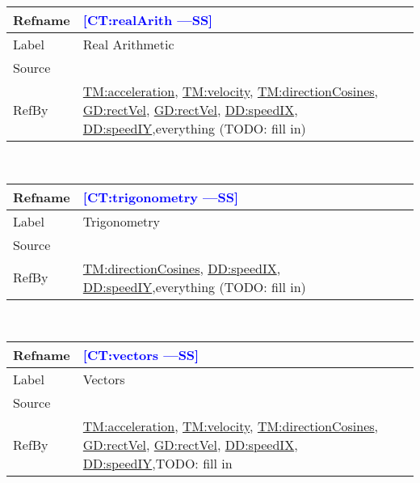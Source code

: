 \documentclass[12pt]{article}
\newcommand{\authornote}[3]{\textcolor{#1}{[#3 ---#2]}}
\newcommand{\authornote}[3]{}
\newcommand{\wss}[1]{\authornote{blue}{SS}{#1}}
\begin{document}
\medskip
\noindent
\begin{minipage}{\textwidth}
\begin{tabular}{>{\raggedright}p{}>{\raggedright\arraybackslash}p{}}
\toprule \textbf{Refname} & \textbf{\wss{CT:realArith}}
\label{CT:realArith}
\\ \midrule
Label & Real Arithmetic
\\ \midrule
Source & \cite{}
\\ \midrule
RefBy & \hyperref[TM:acceleration]{TM:acceleration},
\hyperref[TM:velocity]{TM:velocity},
\hyperref[TM:directionCosines]{TM:directionCosines},
\hyperref[GD:rectVel]{GD:rectVel}, \hyperref[GD:rectVel]{GD:rectVel}, \hyperref[DD:speedIX]{DD:speedIX}, \hyperref[DD:speedIY]{DD:speedIY},everything (TODO: fill in)
\\ \bottomrule
\end{tabular}
\end{minipage}
~\\

\medskip
\noindent
\begin{minipage}{\textwidth}
\begin{tabular}{>{\raggedright}p{}>{\raggedright\arraybackslash}p{}}
\toprule \textbf{Refname} & \textbf{\wss{CT:trigonometry}}
\label{CT:trigonometry}
\\ \midrule
Label & Trigonometry
\\ \midrule
Source & \cite{}
\\ \midrule
RefBy & \hyperref[TM:directionCosines]{TM:directionCosines}, \hyperref[DD:speedIX]{DD:speedIX}, \hyperref[DD:speedIY]{DD:speedIY},everything (TODO: fill in)
\\ \bottomrule
\end{tabular}
\end{minipage}
~\\

\medskip
\noindent
\begin{minipage}{\textwidth}
\begin{tabular}{>{\raggedright}p{}>{\raggedright\arraybackslash}p{}}
\toprule \textbf{Refname} & \textbf{\wss{CT:vectors}}
\label{CT:vectors}
\\ \midrule
Label & Vectors
\\ \midrule
Source & \cite{}
\\ \midrule
RefBy & \hyperref[TM:acceleration]{TM:acceleration},
\hyperref[TM:velocity]{TM:velocity},
\hyperref[TM:directionCosines]{TM:directionCosines},
\hyperref[GD:rectVel]{GD:rectVel}, \hyperref[GD:rectVel]{GD:rectVel}, \hyperref[DD:speedIX]{DD:speedIX}, \hyperref[DD:speedIY]{DD:speedIY},TODO: fill in
\\ \bottomrule
\end{tabular}
\end{minipage}
~\\
\end{document}
